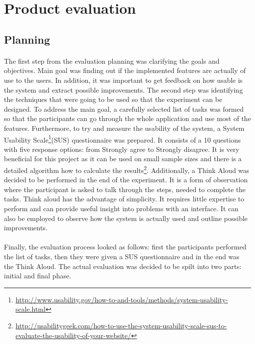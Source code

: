 \documentclass{l4proj}
\begin{document}
\section{Product evaluation}

\subsection{Planning}
\paragraph{}
The first step from the evaluation planning was clarifying the goals and objectives. Main goal was finding out if the implemented features are actually of use to the users. In addition, it was important to get feedback on how usable is the system and extract possible improvements. The second step was identifying the techniques that were going to be used so that the experiment can be designed. To address the main goal,  a carefully selected list of tasks was formed so that the participants can go through the whole application and use most of the features. Furthermore, to try and measure the usability of the system, a System Usability Scale\footnote{\url{http://www.usability.gov/how-to-and-tools/methods/system-usability-scale.html}}(SUS) questionnaire was prepared. It consists of a 10 questions with five response options: from Strongly agree to Strongly disagree. It is very beneficial for this project as it can be used on small sample sizes and there is a detailed algorithm how to calculate the results\footnote{\url{http://usabilitygeek.com/how-to-use-the-system-usability-scale-sus-to-evaluate-the-usability-of-your-website/}}. Additionally, a Think Aloud was decided to be performed in the end of the experiment. It is a form of observation where the participant is asked to talk through the steps, needed to complete the tasks\cite{hci}. Think aloud has the advantage of simplicity. It requires little expertise to perform and can provide useful insight into problems with an interface. It can also be employed to observe how the system is actually used and outline possible improvements.
\paragraph{} 
 Finally, the evaluation process looked as follows: first the participants performed the list of tasks, then they were given a SUS questionnaire and in the end was the Think Aloud. The actual evaluation was decided to be spilt into two parts: initial and final phase.
\end{document}

